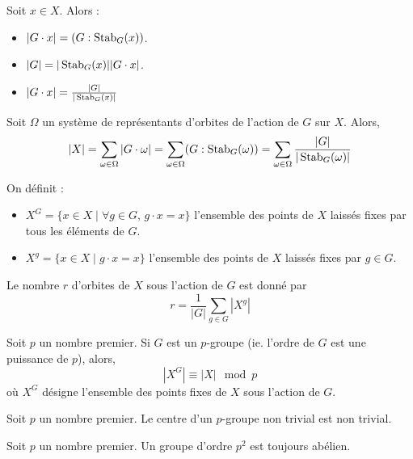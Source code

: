 
	\begin{proposition}
		Soit $x \in X$. Alors :
		\begin{itemize}
			\item $|G \cdot x| = (G : \operatorname{Stab}_G(x))$.
			\item $|G| = |\operatorname{Stab}_G(x)| |G \cdot x|$.
			\item $|G \cdot x| = \frac{|G|}{|\operatorname{Stab}_G(x)|}$
		\end{itemize}
	\end{proposition}

	\begin{theorem}
		Soit $\Omega$ un système de représentants d'orbites de l'action de $G$ sur $X$. Alors,
		\[ |X| = \sum_{\omega \in \Omega} |G \cdot \omega| = \sum_{\omega \in \Omega} (G : \operatorname{Stab}_G(\omega)) = \sum_{\omega \in \Omega} \frac{|G|}{|\operatorname{Stab}_G(\omega)|} \]
	\end{theorem}

	\begin{definition}
		On définit :
		\begin{itemize}
			\item $X^G = \{ x \in X \mid \forall g \in G, \, g \cdot x = x \}$ l'ensemble des points de $X$ laissés fixes par tous les éléments de $G$.
			\item $X^g = \{ x \in X \mid g \cdot x = x \}$ l'ensemble des points de $X$ laissés fixes par $g \in G$.
		\end{itemize}
	\end{definition}

	\begin{theorem}
		Le nombre $r$ d'orbites de $X$ sous l'action de $G$ est donné par
		\[ r = \frac{1}{|G|} \sum_{g \in G} |X^g| \]
	\end{theorem}

	\begin{corollary}
		Soit $p$ un nombre premier. Si $G$ est un $p$-groupe (ie. l'ordre de $G$ est une puissance de $p$), alors,
		\[ |X^G| \equiv |X| \mod p \]
		où $X^G$ désigne l'ensemble des points fixes de $X$ sous l'action de $G$.
	\end{corollary}

	\begin{corollary}
		Soit $p$ un nombre premier. Le centre d'un $p$-groupe non trivial est non trivial.
	\end{corollary}

	\begin{corollary}
		Soit $p$ un nombre premier. Un groupe d'ordre $p^2$ est toujours abélien.
	\end{corollary}

